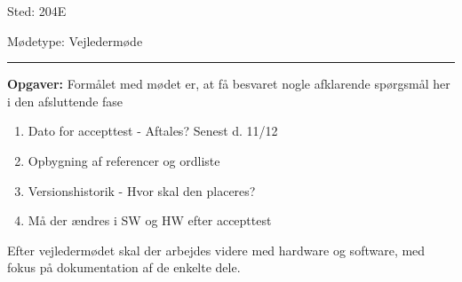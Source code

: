 Sted: \tabto{7em} 204E

Mødetype: \tabto{7em} Vejledermøde \newline


\hrule
\textbf{Opgaver:} \newline
Formålet med mødet er, at få besvaret nogle afklarende spørgsmål her i den afsluttende fase
\begin{enumerate}
\item Dato for accepttest - Aftales? Senest d. 11/12
\item Opbygning af referencer og ordliste
\item Versionshistorik - Hvor skal den placeres?
\item Må der ændres i SW og HW efter accepttest
\end{enumerate}
Efter vejledermødet skal der arbejdes videre med hardware og software, med fokus på dokumentation af de enkelte dele.